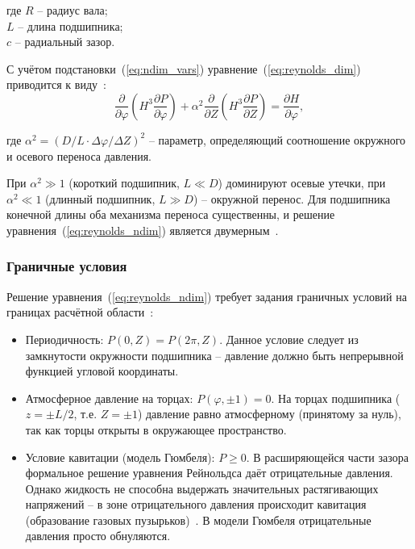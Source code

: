 \noindent где $R$ -- радиус вала;\\
\hphantom{где }$L$ -- длина подшипника;\\
\hphantom{где }$c$ -- радиальный зазор.

С учётом подстановки~(\ref{eq:ndim_vars}) уравнение~(\ref{eq:reynolds_dim}) приводится к виду~\cite{hamrock}:
\begin{equation}
    \frac{\partial}{\partial\varphi}\!\left(H^3 \frac{\partial P}{\partial\varphi}\right) + \alpha^2 \frac{\partial}{\partial Z}\!\left(H^3 \frac{\partial P}{\partial Z}\right) = \frac{\partial H}{\partial\varphi},
    \label{eq:reynolds_ndim}
\end{equation}

\noindent где $\alpha^2 = (D/L \cdot \Delta\varphi/\Delta Z)^{2}$ -- параметр, определяющий соотношение окружного и осевого переноса давления.

При $\alpha^2 \gg 1$ (короткий подшипник, $L \ll D$) доминируют осевые утечки, при $\alpha^2 \ll 1$ (длинный подшипник, $L \gg D$) -- окружной перенос. Для подшипника конечной длины оба механизма переноса существенны, и решение уравнения~(\ref{eq:reynolds_ndim}) является двумерным~\cite{pinkus}.

\subsubsection{Граничные условия}

Решение уравнения~(\ref{eq:reynolds_ndim}) требует задания граничных условий на границах расчётной области~\cite{hamrock}:

\begin{itemize}
    \item Периодичность: $P(0, Z) = P(2\pi, Z)$. Данное условие следует из замкнутости окружности подшипника -- давление должно быть непрерывной функцией угловой координаты.
    \item Атмосферное давление на торцах: $P(\varphi, \pm 1) = 0$. На торцах подшипника ($z = \pm L/2$, т.е. $Z = \pm 1$) давление равно атмосферному (принятому за нуль), так как торцы открыты в окружающее пространство.
    \item Условие кавитации (модель Гюмбеля): $P \geq 0$. В расширяющейся части зазора формальное решение уравнения Рейнольдса даёт отрицательные давления. Однако жидкость не способна выдержать значительных растягивающих напряжений -- в зоне отрицательного давления происходит кавитация (образование газовых пузырьков)~\cite{zhang2016}. В модели Гюмбеля отрицательные давления просто обнуляются.
\end{itemize}

